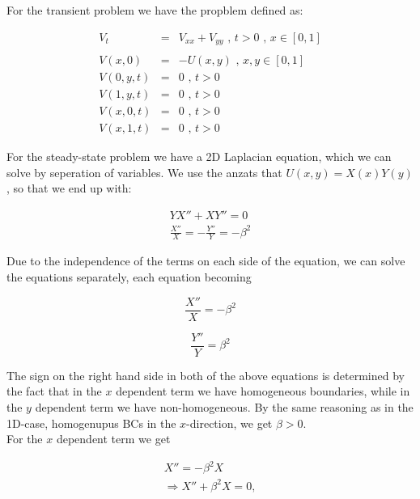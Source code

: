 \documentclass{article}
\begin{document}
For the transient problem we have the propblem defined as:

\begin{subequations}
	\begin{eqnarray}
	\label{eqn:transientPDE}
	V_t &=& V_{xx} + V_{yy} \textit{ , } t>0 \textit{ , } x \in [0,1] \\ \nonumber
	\\
	\label{eqn:transientICPDE}
	V(x,0) &=& -U(x,y) \textit{ , } x,y \in [0,1] \\
	V(0,y,t) &=& 0 \textit{ , } t>0 \\
	V(1,y,t) &=& 0 \textit{ , } t>0 \\
	V(x,0,t) &=& 0 \textit{ , } t>0 \\
	V(x,1,t) &=& 0 \textit{ , } t>0 
	\end{eqnarray}
\end{subequations}

For the steady-state problem we have a 2D Laplacian equation, which we can solve by seperation of variables. We use the anzats that $U(x,y) = X(x)Y(y)$, so that we end up with:

\begin{eqnarray}
\nonumber
YX'' + XY''=0 \\ \nonumber
\frac{X''}{X} = - \frac{Y''}{Y} = -\beta^2
\end{eqnarray}

Due to the independence of the terms on each side of the equation, we can solve the equations separately, each equation becoming

\begin{equation}
\frac{X''}{X} = -\beta^2 \nonumber
\end{equation}

\begin{equation}
\frac{Y''}{Y} = \beta^2 \nonumber
\end{equation}

The sign on the right hand side in both of the above equations is determined by the fact that in the $x$ dependent term we have homogeneous boundaries, while in the $y$ dependent term we have non-homogeneous. By the same reasoning as in the 1D-case, homogenupus BCs in the $x$-direction, we get $\beta > 0$. \\

For the $x$ dependent term we get

\begin{eqnarray}
\nonumber
X'' = -\beta^2 X \\ \nonumber
\Rightarrow X'' + \beta^2 X = 0,
\end{eqnarray}
\end{document}
